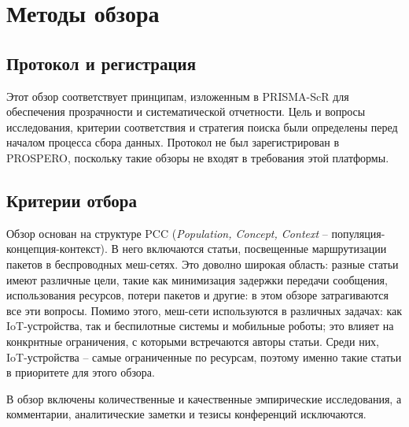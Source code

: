 \documentclass[%
]{report}
\begin{document}
\section{Методы обзора}\label{methods}

\subsection{Протокол и регистрация}\label{protocol-and-registration}

Этот обзор соответствует принципам, изложенным в
PRISMA-ScR для обеспечения прозрачности и
систематической отчетности.
Цель и вопросы исследования, критерии соответствия
и стратегия поиска были определены перед началом процесса сбора данных.
Протокол не был зарегистрирован в PROSPERO,
поскольку такие обзоры не входят в требования этой платформы.

\subsection{Критерии отбора}\label{eligibility-criteria}

Обзор основан на структуре PCC\cite{afc61c6cf471416489e36a4bc382d3b9}
(\emph{Population, Concept, Context} -- популяция-концепция-контекст).
В него включаются статьи, посвещенные маршрутизации пакетов в беспроводных меш-сетях.
Это доволно широкая область:
разные статьи имеют различные цели,
такие как минимизация задержки передачи сообщения,
использования ресурсов,
потери пакетов и другие: в этом обзоре затрагиваются
все эти вопросы.
Помимо этого, меш-сети используются в различных задачах:
как IoT-устройства, так и беспилотные системы
и мобильные роботы;
это влияет на конкрнтные ограничения,
с которыми встречаются авторы статьи.
Среди них, IoT-устройства -- самые ограниченные по ресурсам,
поэтому именно такие статьи в приоритете для этого обзора.

В обзор включены количественные и качественные эмпирические исследования,
а комментарии, аналитические заметки и тезисы конференций исключаются.

\end{document}
